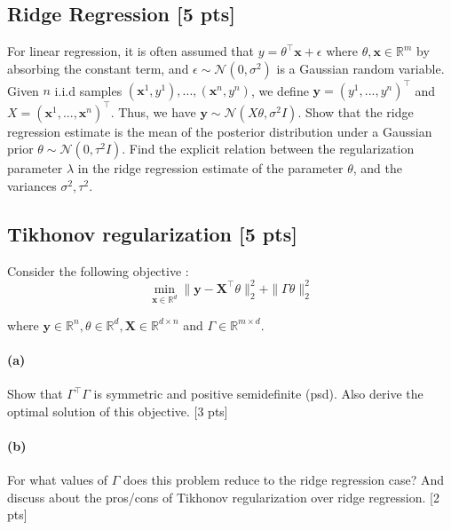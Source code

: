 \documentclass[twoside,10pt]{article}
\begin{document}
\subsection{Ridge Regression [5 pts]}
For linear regression, it is often assumed that $y = \theta^\top \textbf{x} + \epsilon$ where $\theta, \textbf{x} \in \mathbb{R}^m$ by absorbing the constant term, and $\epsilon \sim \mathcal{N} (0, \sigma^2)$ is a Gaussian random variable. Given $n$ i.i.d samples $(\textbf{x}^1, y^1), ..., (\textbf{x}^n, y^n)$, we define $\textbf{y} = (y^1, ..., y^n)^\top$ and $X = (\textbf{x}^1, ..., \textbf{x}^n)^\top$. Thus, we have $\textbf{y} \sim \mathcal{N} (X\theta, \sigma^2 I)$. Show that the ridge regression estimate is the mean of the posterior distribution under a Gaussian prior $\theta \sim \mathcal{N} (0, \tau^2 I)$. Find the explicit relation between the regularization parameter $\lambda$ in the ridge regression estimate of the parameter $\theta$, and the variances $\sigma^2, \tau^2$.

\subsection{Tikhonov regularization [5 pts]}

Consider the following objective : 
\[
\min_{\mathbf{x} \in \mathbb{R}^d} \|\mathbf{y} - \mathbf{X}^\top \theta \|_2^2 + \|\Gamma \theta\|_2^2 
\]

where $\mathbf{y} \in \mathbb{R}^n, \theta \in \mathbb{R}^d, \mathbf{X} \in \mathbb{R}^{d \times n}$ and $\Gamma \in \mathbb{R}^{m \times d}$. 

\paragraph{(a)} Show that $\Gamma^\top \Gamma$ is symmetric and positive semidefinite (psd). Also derive the optimal solution of this objective. [3 pts]

\paragraph{(b)} For what values of $\Gamma$ does this problem reduce to the ridge regression case? And discuss about the pros/cons of Tikhonov regularization over ridge regression. [2 pts]

\vspace{1cm}
\end{document}
